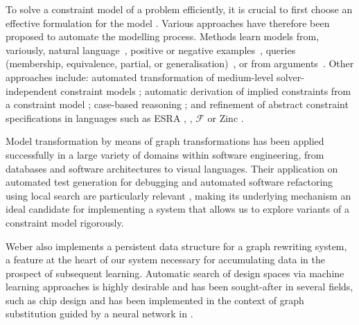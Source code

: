\documentclass[runningheads]{llncs}
\begin{document}
To solve a constraint model of a problem efficiently, it is crucial to first choose an effective formulation for the model \cite{freuder2018:progress}.
Various approaches have therefore been proposed to automate the modelling process.
Methods learn models from, variously,
natural language~\cite{Kiziltan2016:constraint},
positive or negative examples~\cite{DeRaedt2018:learning,Bessiere2017:constraint,Arcangioli2016:multiple},
queries (membership, equivalence, partial, or generalisation)~\cite{Beldiceanu2012:model,Bessiere2013:constraint,Bessiere2014:boosting}, or
from arguments~\cite{Shchekotykhin2009:argumentation}.
Other approaches include:
automated transformation of medium-level solver-independent constraint models \cite{Rendl2010:thesis,Nethercote2007:minizinc,OPLBook,Mills1999:eacl,Nightingale2014:automatically,savilerow,Nightingale2015:automatically};
automatic derivation of implied constraints from a constraint model \cite{frisch2003:cgrass,colton2001:constraint,charnley2006:automatic,Bessiere2007:learning,Leo2013:globalizing};
case-based reasoning \cite{Little2003:using}; and
refinement of abstract constraint specifications \cite{Frisch2005:rules} in languages such as ESRA \cite{Flener2003:esra}, \essence \cite{frisch2008:essence}, ${\mathcal F}$ \cite{Hnich2003:function} or Zinc \cite{marriott2008:design,ZincModref10,Rafeh2016:linzinc}.

Model transformation by means of graph transformations \cite{mens2005use} has been applied successfully in a large variety of domains within software engineering, from databases and software architectures to visual languages\cite{kahani2019survey,taentzer2005model}.
Their application on automated test generation for debugging \cite{troya2022model} and automated software refactoring using local search are particularly relevant \cite{qayum2009local},
making its underlying mechanism an ideal candidate for implementing a system that allows us to explore variants of a constraint model rigorously.

Weber \cite{weber2022tool} also implements a persistent data structure for a graph rewriting system, a feature at the heart of our system necessary for accumulating data in the prospect of subsequent learning. Automatic search of design spaces via machine learning approaches is highly desirable and has been sought-after in several fields, such as chip design \cite{hu2020machine} and has been implemented in the context of graph substitution guided by a neural network in \cite{jia2019taso}.
\end{document}
